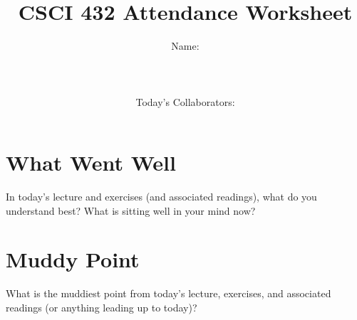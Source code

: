 \documentclass{article}
\title{CSCI 432 Attendance Worksheet}
\author{Name: \rule{3in}{0.15mm} \\~\\
    Today's Collaborators: \rule{3in}{0.15mm} }
\date{date: \rule{3in}{0.15mm} }
\begin{document}
\maketitle

\noindent
\section*{What Went Well}

In today's lecture and exercises (and associated readings),
what do you understand best?  What is sitting
well in your mind now?

\vspace{3in}

\section*{Muddy Point}

What is the muddiest point from today's lecture, exercises, and associated
readings (or anything leading up to today)?
\end{document}
